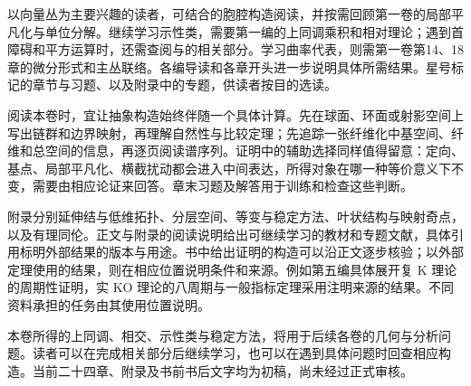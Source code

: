 \ProseParagraphBreak

以向量丛为主要兴趣的读者，可结合的胞腔构造阅读，并按需回顾第一卷的局部平凡化与单位分解。继续学习示性类，需要第一编的上同调乘积和相对理论；遇到首障碍和平方运算时，还需查阅与的相关部分。学习曲率代表，则需第一卷第14、18章的微分形式和主丛联络。各编导读和各章开头进一步说明具体所需结果。星号标记的章节与习题、以及附录中的专题，供读者按目的选读。

\ProseParagraphBreak

阅读本卷时，宜让抽象构造始终伴随一个具体计算。先在球面、环面或射影空间上写出链群和边界映射，再理解自然性与比较定理；先追踪一张纤维化中基空间、纤维和总空间的信息，再逐页阅读谱序列。证明中的辅助选择同样值得留意：定向、基点、局部平凡化、横截扰动都会进入中间表达，所得对象在哪一种等价意义下不变，需要由相应论证来回答。章末习题及解答用于训练和检查这些判断。

\ProseParagraphBreak

附录分别延伸结与低维拓扑、分层空间、等变与稳定方法、叶状结构与映射奇点，以及有理同伦。正文与附录的阅读说明给出可继续学习的教材和专题文献，具体引用标明外部结果的版本与用途。书中给出证明的构造可以沿正文逐步核验；以外部定理使用的结果，则在相应位置说明条件和来源。例如第五编具体展开复 K 理论的周期性证明，实 KO 理论的八周期与一般指标定理采用注明来源的结果。不同资料承担的任务由其使用位置说明。

\ProseParagraphBreak

本卷所得的上同调、相交、示性类与稳定方法，将用于后续各卷的几何与分析问题。读者可以在完成相关部分后继续学习，也可以在遇到具体问题时回查相应构造。当前二十四章、附录及书前书后文字均为初稿，尚未经过正式审核。
